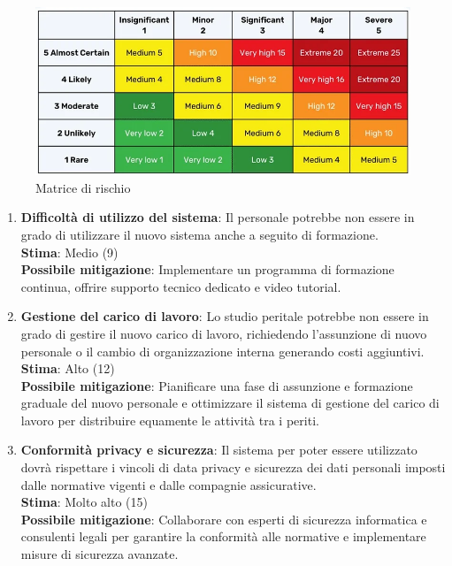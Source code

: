 \documentclass[a4paper,12pt, openright]{report}
\begin{document}
\begin{figure}[ht]
    \centering
    \includegraphics[width=14cm]{img/Tab_rischi.jpg}
    \caption{Matrice di rischio}
    \label{fig:risk}
\end{figure}

\begin{enumerate}
    \item \textbf{Difficoltà di utilizzo del sistema}: Il personale potrebbe non essere in grado di utilizzare il nuovo sistema anche a seguito di formazione.
    \\
    \textbf{Stima}: Medio (9)
    \\
    \textbf{Possibile mitigazione}: Implementare un programma di formazione continua, offrire supporto tecnico dedicato e video tutorial.

    \item \textbf{Gestione del carico di lavoro}: Lo studio peritale potrebbe non essere in grado di gestire il nuovo carico di lavoro, richiedendo l'assunzione di nuovo personale o il cambio di organizzazione interna generando costi aggiuntivi.
    \\
    \textbf{Stima}: Alto (12)
    \\
    \textbf{Possibile mitigazione}: Pianificare una fase di assunzione e formazione graduale del nuovo personale e ottimizzare il sistema di gestione del carico di lavoro per distribuire equamente le attività tra i periti.

    \item \textbf{Conformità privacy e sicurezza}: Il sistema per poter essere utilizzato dovrà rispettare i vincoli di data privacy e sicurezza dei dati personali imposti dalle normative vigenti e dalle compagnie assicurative.
    \\
    \textbf{Stima}: Molto alto (15)
    \\
    \textbf{Possibile mitigazione}: Collaborare con esperti di sicurezza informatica e consulenti legali per garantire la conformità alle normative e implementare misure di sicurezza avanzate.


\end{enumerate}
\end{document}
